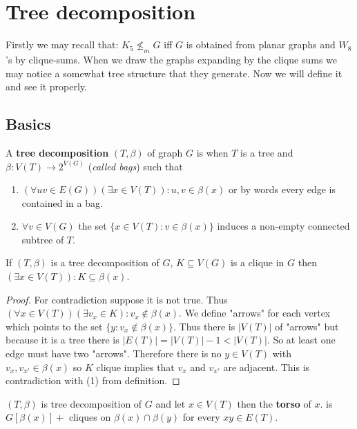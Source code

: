 \chapter{Tree decomposition}

Firstly we may recall that: $K_{5} \nleq_{m} G$ iff $G$ is obtained from planar graphs and $W_{8}$'s by clique-sums. When we draw the graphs expanding by the clique sums we may notice a somewhat tree structure that they generate. Now we will define it and see it properly.

\section{Basics}

\begin{defn}
	A \textbf{tree decomposition} $(T, \beta)$ of graph $G$ is when $T$ is a tree and $\beta: V(T) \to 2^{V(G)}$ (\textit{called bags}) such that
	
	\begin{enumerate}[(1)]
		\item $(\forall uv \in E(G)) (\exists x \in V(T)): u,v \in \beta(x)$ or by words every edge is contained in a bag.
		\item $\forall v \in V(G)$ the set $\{x \in V(T) : v \in \beta(x)\}$ induces a non-empty connected subtree of $T$.
	\end{enumerate}
\end{defn}

\begin{lemma}
	If $(T, \beta)$ is a tree decomposition of $G$, $K \subseteq V(G)$ is a clique in $G$ then $(\exists x \in V(T)) : K \subseteq \beta(x)$.
\end{lemma}

\begin{proof}
	For contradiction suppose it is not true. Thus $(\forall x \in V(T)) (\exists v_{x} \in K) : v_{x} \notin \beta(x)$. We define "arrows" for each vertex which points to the set $\{y : v_{x} \notin \beta(x)\}$. Thus there is $|V(T)|$ of "arrows" but because it is a tree there is $|E(T)| = |V(T)| - 1 < |V(T)|$. So at least one edge must have two "arrows". Therefore there is no $y \in V(T)$ with $v_{x}, v_{x'} \in \beta(x)$ so $K$ clique implies that $v_{x}$ and $v_{x'}$ are adjacent. This is contradiction with (1) from definition.
\end{proof}

\begin{defn}
	$(T, \beta)$ is tree decomposition of $G$ and let $x \in V(T)$ then the \textbf{torso} of $x$. is $G[\beta(x)] + $ cliques on $\beta(x) \cap \beta(y)$ for every $xy \in E(T)$.
\end{defn}

